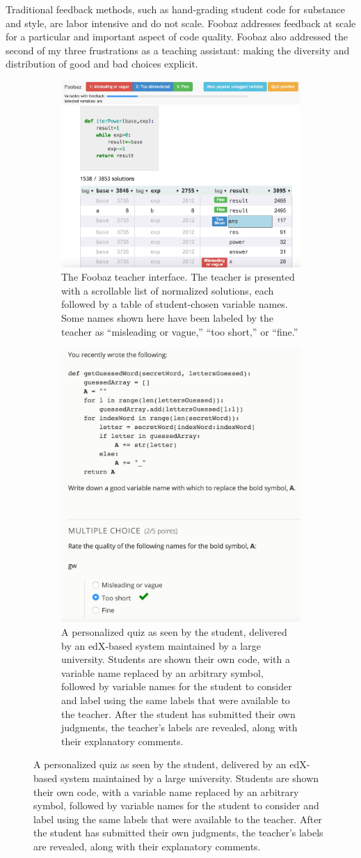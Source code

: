 Traditional feedback methods, such as hand-grading student code for substance and style, are labor intensive and do not scale. Foobaz addresses feedback at scale for a particular and important aspect of code quality. Foobaz also addressed the second of my three frustrations as a teaching assistant: making the diversity and distribution of good and bad choices explicit. %

\begin{figure}[p]

\begin{subfigure}[b]{1.0\textwidth}
\centering
\includegraphics[width=0.75\linewidth]{Body/figures/foobaz/FoobazInitialView4.jpg}
\caption{The Foobaz teacher interface. The teacher is presented with a scrollable list of normalized solutions, each followed by a table of student-chosen variable names. Some names shown here have been labeled by the teacher as ``misleading or vague,'' ``too short,'' or ``fine.''}
\label{fig:foobaz_teacherview}
\end{subfigure}

\begin{subfigure}[b]{1.0\textwidth}
\centering
\includegraphics[width=0.4\linewidth]{Body/figures/foobaz/feedbackQuizExample.png}
\caption{A personalized quiz as seen by the student, delivered by an edX-based system maintained by a large university. Students are shown their own code, with a variable name replaced by an arbitrary symbol, followed by variable names for the student to consider and label using the same labels that were available to the teacher. After the student has submitted their own judgments, the teacher’s labels are revealed, along with their explanatory comments.}
\label{fig:foobaz_studentview}
\end{subfigure}


\end{figure}
